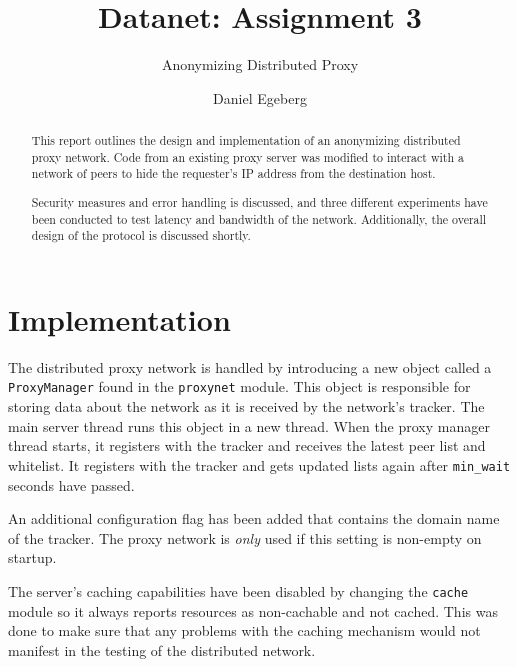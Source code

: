 \documentclass{sig-alternate}
\begin{document}
\title{Datanet: Assignment 3}
\subtitle{Anonymizing Distributed Proxy}


\author{
\alignauthor
    Daniel Egeberg\\
}

\maketitle

\begin{abstract}
    This report outlines the design and implementation of an anonymizing
    distributed proxy network. Code from an existing proxy server was modified
    to interact with a network of peers to hide the requester's IP address
    from the destination host.

    Security measures and error handling is discussed, and three different
    experiments have been conducted to test latency and bandwidth of the
    network. Additionally, the overall design of the protocol is discussed
    shortly.
\end{abstract}

\section{Implementation}
\label{sec:implementation}

The distributed proxy network is handled by introducing a new object called
a \verb+ProxyManager+ found in the \verb+proxynet+ module. This object is
responsible for storing data about the network as it is received by the
network's tracker. The main server thread runs this object in a new thread.
When the proxy manager thread starts, it registers with the tracker and
receives the latest peer list and whitelist. It registers with the tracker and
gets updated lists again after \verb+min_wait+ seconds have passed.

An additional configuration flag has been added that contains the domain name
of the tracker. The proxy network is \emph{only} used if this setting is
non-empty on startup.

The server's caching capabilities have been disabled by changing the
\verb+cache+ module so it always reports resources as non-cachable and
not cached. This was done to make sure that any problems with the caching
mechanism would not manifest in the testing of the distributed network.
\end{document}
